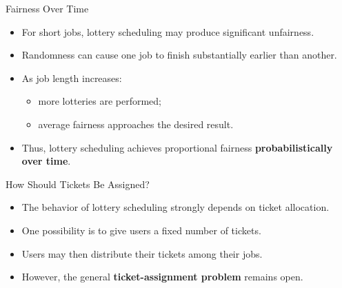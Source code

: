 
\begin{frame}{Fairness Over Time}
    \begin{itemize}
        \item For short jobs, lottery scheduling may produce significant unfairness.
        \item Randomness can cause one job to finish substantially earlier than another.
        \item As job length increases:
        \begin{itemize}
            \item more lotteries are performed;
            \item average fairness approaches the desired result.
        \end{itemize}
        \item Thus, lottery scheduling achieves proportional fairness
        \textbf{probabilistically over time}.
    \end{itemize}
\end{frame}


\begin{frame}{How Should Tickets Be Assigned?}
    \begin{itemize}
        \item The behavior of lottery scheduling strongly depends on ticket allocation.
        \item One possibility is to give users a fixed number of tickets.
        \item Users may then distribute their tickets among their jobs.
        \item However, the general \textbf{ticket-assignment problem} remains open.
    \end{itemize}
\end{frame}


